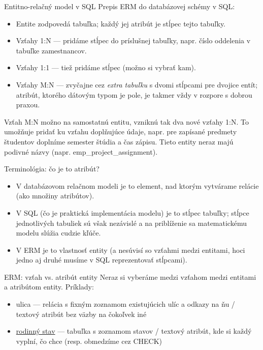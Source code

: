 \documentclass[12pt]{beamer}
\begin{document}
\begin{frame}[fragile]{Entitno-relačný model v SQL}
Prepis ERM do databázovej schémy v SQL: 
\begin{itemize}
\item Entite zodpovedá tabuľka; každý jej atribút je stĺpec tejto tabuľky.
\item Vzťahy 1:N --- pridáme stĺpec do príslušnej tabuľky, napr. číslo oddelenia v tabuľke zamestnancov.
\item Vzťahy 1:1 --- tiež pridáme stĺpec (možno si vybrať kam).
\item Vzťahy M:N --- zvyčajne cez \emph{extra tabuľku} s dvomi stĺpcami pre dvojice entít;
atribút, ktorého dátovým typom je pole, je takmer vždy v rozpore s dobrou praxou.
\end{itemize}
Vzťah M:N možno  na samostatnú entitu, vzniknú tak dva nové vzťahy 1:N.
To umožňuje pridať ku vzťahu doplňujúce údaje, napr. pre zapísané predmety študentov doplníme semester štúdia a čas zápisu.
Tieto  entity neraz majú podivné názvy (napr. emp\_project\_assignment).
\end{frame}

\begin{frame}[fragile]{Terminológia: čo je to \alert{atribút}?}
\begin{itemize}
\item V  databázovom relačnom modeli je to \alert{ element}, nad ktorým vytvárame relácie (ako množiny atribútov).
\item V SQL (čo je praktická implementácia  modelu) je to \alert{stĺpec tabuľky}; 
  stĺpce jednotlivých tabuliek sú však nezávislé a na priblíženie sa matematickému modelu slúžia cudzie kľúče.
\item V ERM je to \alert{vlastnosť entity} (a nesúvisí so vzťahmi medzi entitami, hoci jedno aj druhé musíme v SQL reprezentovať stĺpcami). 
\end{itemize}
\end{frame}

\begin{frame}[fragile]{ERM: vzťah vs. atribút entity}
Neraz si vyberáme medzi \alert{vzťahom medzi entitami}\\ a \alert{atribútom entity}. Príklady:
\begin{itemize}
\item ulica --- relácia s fixným zoznamom existujúcich ulíc a odkazy na ňu / textový atribút bez väzby na čokoľvek iné
\item \href{https://slovak.statistics.sk/PACVPEM/vocabPagesDetails.html?id=35201&lang=sk}{rodinný stav} ---
    tabuľka s  zoznamom stavov / textový atribút, kde si každý vyplní, čo chce (resp. obmedzíme cez CHECK)
\end{itemize}
\end{frame}
\end{document}
